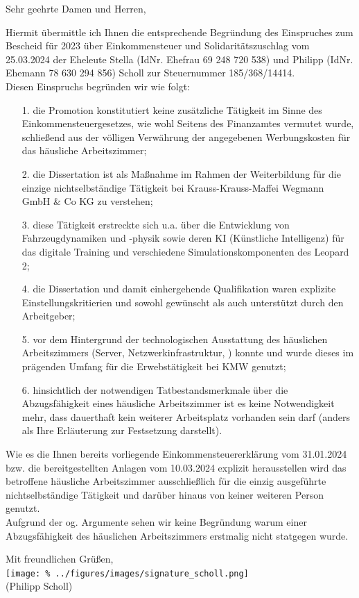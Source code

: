 \documentclass[
  fontsize=11pt,
  paper=a4,
  parskip=half,
  enlargefirstpage=on,    %
  fromalign=right,        %
  fromphone=on,           %
  fromrule=aftername,     %
  addrfield=off,           %
  backaddress=off,         %
  subject=beforeopening,  %
  locfield=narrow,        %
  foldmarks=on,           %
]{scrlttr2}
\begin{document}
\begin{letter}{}
  \opening{Sehr geehrte Damen und Herren,}

  Hiermit übermittle ich Ihnen die entsprechende Begründung des Einspruches zum Bescheid für 2023 über Einkommensteuer und Solidaritätszuschlag vom 25.03.2024 der Eheleute Stella (IdNr. Ehefrau 69 248 720 538) und Philipp (IdNr. Ehemann 78 630 294 856) Scholl zur Steuernummer 185/368/14414.\\%

  Diesen Einspruchs begründen wir wie folgt:\\%

  \begin{enumerate}
    \item[1.]{die Promotion konstitutiert keine zusätzliche Tätigkeit im Sinne des Einkommensteuergesetzes, wie wohl Seitens des Finanzamtes vermutet wurde, schließend aus der völligen Verwährung der angegebenen Werbungskosten für das häusliche Arbeitszimmer;}%
    \item[2.]{die Dissertation ist als Maßnahme im Rahmen der Weiterbildung für die einzige nichtselbständige Tätigkeit bei Krauss-Krauss-Maffei Wegmann GmbH \& Co KG zu verstehen;}%
    \item[3.]{diese Tätigkeit erstreckte sich u.a. über die Entwicklung von Fahrzeugdynamiken und -physik sowie deren KI (Künstliche Intelligenz) für das digitale Training und verschiedene Simulationskomponenten des Leopard 2;}%
    \item[4.]{die Dissertation und damit einhergehende Qualifikation waren explizite Einstellungskritierien und sowohl gewünscht als auch unterstützt durch den Arbeitgeber;}%
    \item[5.]{vor dem Hintergrund der technologischen Ausstattung des häuslichen Arbeitszimmers (Server, Netzwerkinfrastruktur, ) konnte und wurde dieses im prägenden Umfang für die Erwebstätigkeit bei KMW genutzt;}%
    \item[6.]{hinsichtlich der notwendigen Tatbestandsmerkmale über die Abzugsfähigkeit eines häusliche Arbeitszimmer ist es keine Notwendigkeit mehr, dass dauerthaft kein weiterer Arbeitsplatz vorhanden sein darf (anders als Ihre Erläuterung zur Festsetzung darstellt).}%
  \end{enumerate}%

  Wie es die Ihnen bereits vorliegende Einkommensteuererklärung vom 31.01.2024 bzw. die bereitgestellten Anlagen vom 10.03.2024 explizit herausstellen wird das betroffene häusliche Arbeitszimmer ausschließlich für die einzig ausgeführte nichtselbständige Tätigkeit und darüber hinaus von keiner weiteren Person genutzt.\\%
  Aufgrund der og. Argumente sehen wir keine Begründung warum einer Abzugsfähigkeit des häuslichen Arbeitszimmers erstmalig nicht statgegen wurde.%

  Mit freundlichen Grüßen,\\%
  \texttt{[image: \%
    ../figures/images/signature\_scholl.png]}\\[-0.7cm]%
  (Philipp Scholl)%
\end{letter}
\end{document}

